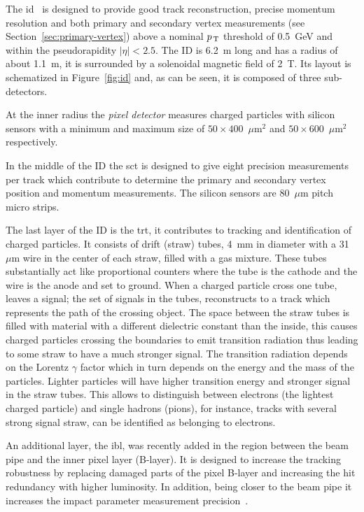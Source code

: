The \gls{id}~\cite{ATLASPaper} is designed to provide good track reconstruction,
precise momentum resolution and both primary and secondary vertex measurements
(see Section~\ref{sec:primary-vertex}) above a nominal $p_\mathrm{\, T}$ threshold of
0.5~GeV and within the pseudorapidity $|\eta| < 2.5$. The ID is 6.2~m long and
has a radius of about 1.1~m, it is surrounded by a solenoidal magnetic field of
2~T. Its layout is schematized in Figure~\ref{fig:id} and, as can be seen, it is
composed of three sub-detectors.

At the inner radius the \emph{pixel detector} measures charged particles with
silicon sensors with a minimum and maximum size of $50 \times 400$~$\mu$m$^2$
and $50 \times 600$~$\mu$m$^2$ respectively.

In the middle of the ID the \gls{sct} is designed to give eight precision
measurements per track which contribute to determine the primary and secondary
vertex position and momentum measurements. The silicon sensors are 80~$\mu$m
pitch micro strips.

The last layer of the ID is the \gls{trt}, it contributes to tracking and
identification of charged particles. It consists of drift (straw) tubes, 4~mm in
diameter with a 31~$\mu$m wire in the center of each straw, filled with a gas
mixture. These tubes substantially act like proportional counters where the tube
is the cathode and the wire is the anode and set to ground. When a charged
particle cross one tube, leaves a signal; the set of signals in the tubes,
reconstructs to a track which represents the path of the crossing object. The
space between the straw tubes is filled with material with a different
dielectric constant than the inside, this causes charged particles crossing the
boundaries to emit transition radiation thus leading to some straw to have a
much stronger signal. The transition radiation depends on the Lorentz $\gamma$
factor which in turn depends on the energy and the mass of the particles.
Lighter particles will have higher transition energy and stronger signal in the
straw tubes. This allows to distinguish between electrons (the lightest charged
particle) and single hadrons (pions), for instance, tracks with several strong
signal straw, can be identified as belonging to electrons.

An additional layer, the \gls{ibl}, was recently added in the region between the
beam pipe and the inner pixel layer (B-layer). It is designed to increase the
tracking robustness by replacing damaged parts of the pixel B-layer and
increasing the hit redundancy with higher luminosity. In addition, being closer
to the beam pipe it increases the impact parameter measurement
precision~\cite{IBL}.

